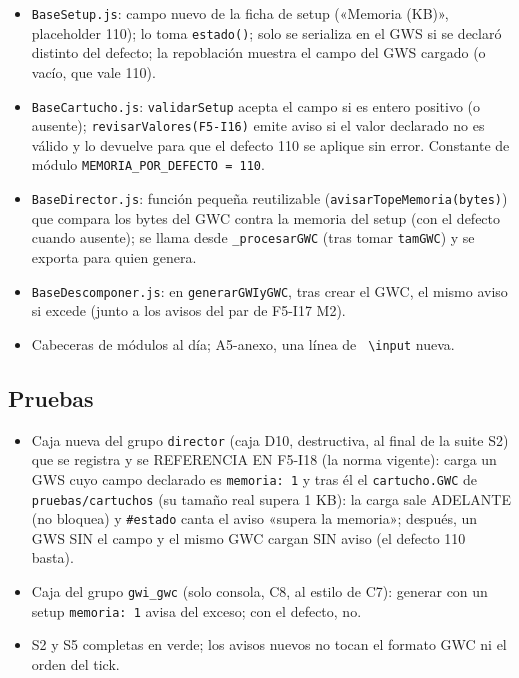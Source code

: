 \begin{itemize}
	\item \texttt{BaseSetup.js}: campo nuevo de la ficha de setup
	(«Memoria (KB)», placeholder 110); lo toma \texttt{estado()}; solo se
	serializa en el GWS si se declaró distinto del defecto; la repoblación
	muestra el campo del GWS cargado (o vacío, que vale 110).
	\item \texttt{BaseCartucho.js}: \texttt{validarSetup} acepta el campo
	si es entero positivo (o ausente); \texttt{revisarValores(F5-I16)}
	emite aviso si el valor declarado no es válido y lo devuelve para que
	el defecto 110 se aplique sin error. Constante de módulo
	\texttt{MEMORIA\_POR\_DEFECTO = 110}.
	\item \texttt{BaseDirector.js}: función pequeña reutilizable
	(\texttt{avisarTopeMemoria(bytes)}) que compara los bytes del GWC
	contra la memoria del setup (con el defecto cuando ausente); se llama
	desde \texttt{\_procesarGWC} (tras tomar \texttt{tamGWC}) y se
	exporta para quien genera.
	\item \texttt{BaseDescomponer.js}: en \texttt{generarGWIyGWC}, tras
	crear el GWC, el mismo aviso si excede (junto a los avisos del par de
	F5-I17 M2).
	\item Cabeceras de módulos al día; A5-anexo, una línea de \texttt{
	\textbackslash input} nueva.
\end{itemize}

\subsection{Pruebas}
\label{sec:F5I20Pruebas}

\begin{itemize}
	\item Caja nueva del grupo \texttt{director} (caja D10, destructiva, al
	final de la suite S2) que se registra y se REFERENCIA EN F5-I18 (la
	norma vigente): carga un GWS cuyo campo declarado es \texttt{memoria: 1}
	y tras él el \texttt{cartucho.GWC} de \texttt{pruebas/cartuchos} (su
	tamaño real supera 1 KB): la carga sale ADELANTE (no bloquea) y
	\texttt{\#estado} canta el aviso «supera la memoria»; después, un GWS
	SIN el campo y el mismo GWC cargan SIN aviso (el defecto 110 basta).
	\item Caja del grupo \texttt{gwi\_gwc} (solo consola, C8, al estilo de
	C7): generar con un setup \texttt{memoria: 1} avisa del exceso; con el
	defecto, no.
	\item S2 y S5 completas en verde; los avisos nuevos no tocan el formato
	GWC ni el orden del tick.
\end{itemize}

